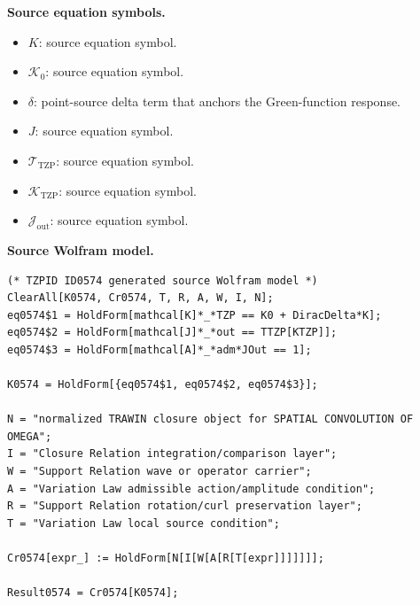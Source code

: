 \begin{minipage}[t]{0.49\linewidth}
\begingroup
\small
\raggedright
\textbf{Source equation symbols.}\par
\begin{itemize}[leftmargin=1.35em,itemsep=1pt,topsep=1pt,parsep=0pt]
    \item $K$: source equation symbol.
    \item $\mathcal{K}_0$: source equation symbol.
    \item $\delta$: point-source delta term that anchors the Green-function response.
    \item $J$: source equation symbol.
    \item $\mathcal{T}_{\mathrm{TZP}}$: source equation symbol.
    \item $\mathcal{K}_{\mathrm{TZP}}$: source equation symbol.
    \item $\mathcal{J}_{\mathrm{out}}$: source equation symbol.
\end{itemize}
\endgroup
\end{minipage}\hfill
\begin{minipage}[t]{0.47\linewidth}
\begingroup
\scriptsize
\raggedright
\textbf{Source Wolfram model.}\par
\begin{Verbatim}[fontsize=\tiny,breaklines=true,breakanywhere=true]
(* TZPID ID0574 generated source Wolfram model *)
ClearAll[K0574, Cr0574, T, R, A, W, I, N];
eq0574$1 = HoldForm[mathcal[K]*_*TZP == K0 + DiracDelta*K];
eq0574$2 = HoldForm[mathcal[J]*_*out == TTZP[KTZP]];
eq0574$3 = HoldForm[mathcal[A]*_*adm*JOut == 1];

K0574 = HoldForm[{eq0574$1, eq0574$2, eq0574$3}];

N = "normalized TRAWIN closure object for SPATIAL CONVOLUTION OF OMEGA";
I = "Closure Relation integration/comparison layer";
W = "Support Relation wave or operator carrier";
A = "Variation Law admissible action/amplitude condition";
R = "Support Relation rotation/curl preservation layer";
T = "Variation Law local source condition";

Cr0574[expr_] := HoldForm[N[I[W[A[R[T[expr]]]]]]];

Result0574 = Cr0574[K0574];
\end{Verbatim}
\endgroup
\end{minipage}

